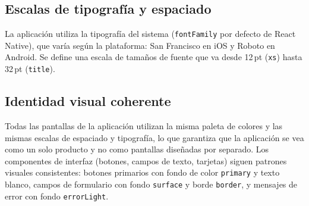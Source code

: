 \subsection{Escalas de tipograf\'ia y espaciado}

La aplicaci\'on utiliza la tipograf\'ia del sistema (\texttt{fontFamily}
por defecto de React Native), que var\'ia seg\'un la plataforma: San Francisco
en iOS y Roboto en Android. Se define una escala de tama\~nos de fuente que
va desde 12\,pt (\texttt{xs}) hasta 32\,pt (\texttt{title}).

\begin{table}[H]
  \centering
  \caption{Escalas de tipograf\'ia y espaciado del tema}
\end{table}

\subsection{Identidad visual coherente}

Todas las pantallas de la aplicaci\'on utilizan la misma paleta de colores y
las mismas escalas de espaciado y tipograf\'ia, lo que garantiza que la
aplicaci\'on se vea como un solo producto y no como pantallas dise\~nadas por
separado. Los componentes de interfaz (botones, campos de texto, tarjetas)
siguen patrones visuales consistentes: botones primarios con fondo de color
\texttt{primary} y texto blanco, campos de formulario con fondo \texttt{surface}
y borde \texttt{border}, y mensajes de error con fondo \texttt{errorLight}.
